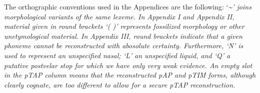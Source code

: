\documentclass[a4paper]{article}
\begin{document}
The orthographic conventions used in the Appendices are the following: {\textquoteleft}\emph{\textup{\~{}{\textquoteright} joins morphological variants of the same lexeme. In Appendix I and Appendix II, material given in }}\emph{\textup{round brackets {\textquoteleft}( ){\textquoteright} represents fossilized morphology or other unetymological material. In Appendix III, round brackets indicate that a given phoneme cannot be reconstructed with abosolute certainty. Furthermore, {\textquoteleft}N{\textquoteright} is used to represent an unspecified nasal; {\textquoteleft}L{\textquoteright} an unspecified liquid, and {\textquoteleft}Q{\textquoteright} a putative postvelar stop for which we have only very weak evidence. An empty slot in the pTAP column means that the reconstructed pAP and pTIM forms, although clearly cognate, are too different to allow for a secure pTAP reconstruction. }}

\clearpage\setcounter{page}{1}\pagestyle{Convertedvi}
\end{document}
